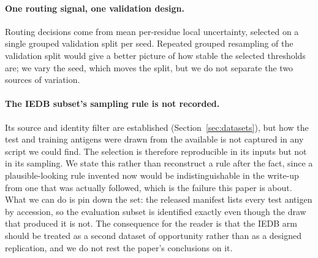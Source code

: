 \paragraph{One routing signal, one validation design.} Routing decisions come
from mean per-residue local uncertainty, selected on a single grouped validation
split per seed. Repeated grouped resampling of the validation split would give a
better picture of how stable the selected thresholds are; we vary the seed,
which moves the split, but we do not separate the two sources of variation.

\paragraph{The IEDB subset's sampling rule is not recorded.} Its source and
identity filter are established (Section~\ref{sec:datasets}), but how the
\IedbSubsetTest{} test and \IedbSubsetTrain{} training antigens were drawn from
the \IedbSourceSequences{} available is not captured in any script we could
find. The selection is therefore reproducible in its inputs but not in its
sampling. We state this rather than reconstruct a rule after the fact, since a
plausible-looking rule invented now would be indistinguishable in the write-up
from one that was actually followed, which is the failure this paper is about.
What we can do is pin down the set: the released manifest lists every test
antigen by accession, so the evaluation subset is identified exactly even
though the draw that produced it is not. The consequence for the reader is
that the IEDB arm should be treated as a second dataset of opportunity rather
than as a designed replication, and we do not rest the paper's conclusions on
it.
